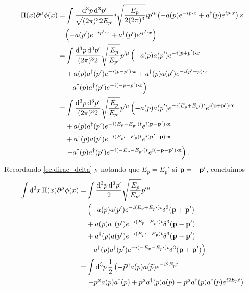 \documentclass{article}
\begin{document}
\begin{align}
\begin{split}
\Pi(x)\partial^\mu\phi(x)=&\int\frac{\dd[3]{p}\dd[3]{p'}}{\sqrt{(2\pi)^32E_{p'}}}i\sqrt{\frac{E_p}{2(2\pi)^3}}ip'^\mu\qty(-a(p)e^{-ip\vdot x}+a^\dagger(p)e^{ip\vdot x})\times\\
&\qty(- a(p')e^{-ip'\vdot x}+ a^\dagger(p')e^{ip'\vdot x})\\
=&\int\frac{\dd[3]{p}\dd[3]{p'}}{(2\pi)^32}\sqrt{\frac{E_p}{E_{p'}}}p'^\mu\left(-a(p)a(p')e^{-i(p+p')\vdot x}\right.\\
&+a(p)a^\dagger(p')e^{-i(p-p')\vdot x}+a^\dagger(p)a(p')e^{-i(p'-p)\vdot x}\\
&\left.-a^\dagger(p)a^\dagger(p')e^{-i(-p-p')\vdot x}\right)\\
=&\int\frac{\dd[3]{p}\dd[3]{p'}}{(2\pi)^32}\sqrt{\frac{E_p}{E_{p'}}}p'^\mu\left(-a(p)a(p')e^{-i(E_p+E_{p'})t}e^{i(\vb{p}+\vb{p'})\vdot\vb{x}}\right.\\
&+a(p)a^\dagger(p')e^{-i(E_p-E_{p'})t}e^{i(\vb{p}-\vb{p'})\vdot\vb{x}}\\
&+a^\dagger(p)a(p')e^{-i(E_{p'}-E_p)t}e^{i(\vb{p'}-\vb{p})\vdot\vb{x}}\\
&\left.-a^\dagger(p)a^\dagger(p')e^{-i(-E_p-E_{p'})t}e^{i(-\vb{p}-\vb{p'})\vdot\vb{x}}\right).\\
\end{split}
\end{align}
Recordando \eqref{ec:dirac_delta} y notando que $E_p=E_p'$ si $\vb{p}=-\vb{p'}$, concluimos
\begin{align}
\begin{split}
\int\dd[3]{x}\Pi(x)\partial^\mu\phi(x)=&\int\frac{\dd[3]{p}\dd[3]{p'}}{2}\sqrt{\frac{E_p}{E_{p'}}}p'^\mu\\
&\left(-a(p)a(p')e^{-i(E_p+E_{p'})t}\delta^3(\vb{p}+\vb{p'})\right.\\
&+a(p)a^\dagger(p')e^{-i(E_p-E_{p'})t}\delta^3(\vb{p}-\vb{p'})\\
&+a^\dagger(p)a(p')e^{-i(E_{p'}-E_p)t}\delta^3(\vb{p}-\vb{p'})\\
&\left.-a^\dagger(p)a^\dagger(p')e^{-i(-E_p-E_{p'})t}\delta^3(\vb{p}+\vb{p'})\right)\\
=&\int\dd[3]{p}\frac{1}{2}\left(-\tilde{p}^\mu a(p)a(\tilde{p})e^{-i2E_pt}\right.\\
&\left.+p^\mu a(p)a^\dagger(p)+p^\mu a^\dagger(p)a(p)-\tilde{p}^\mu a^\dagger(p)a^\dagger(\tilde{p})e^{i2E_pt}\right)
\end{split}
\end{align}
\end{document}
